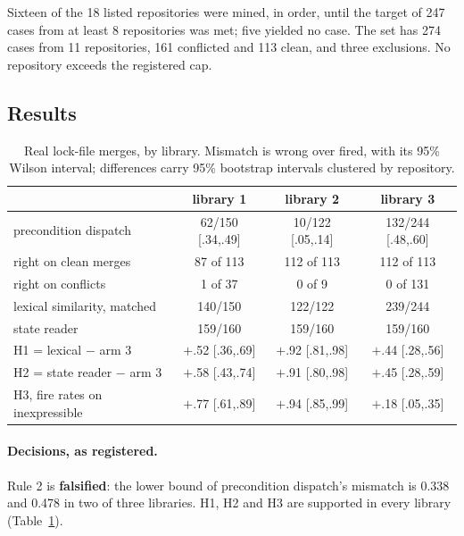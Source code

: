 \documentclass[11pt]{article}
\begin{document}
Sixteen of the 18 listed repositories were mined, in order, until the target of 247 cases from at
least 8 repositories was met; five yielded no case. The set has 274 cases from 11 repositories,
161 conflicted and 113 clean, and three exclusions. No repository exceeds the registered cap.

\subsection{Results}

\begin{table}[t]
\centering
\caption{Real lock-file merges, by library. Mismatch is wrong over fired, with its 95\% Wilson
interval; differences carry 95\% bootstrap intervals clustered by repository.}
\label{tab:real}
\small
\begin{tabularx}{\linewidth}{Xccc}
\toprule
& library 1 & library 2 & library 3 \\
\midrule
precondition dispatch & 62/150 [.34,.49] & 10/122 [.05,.14] & 132/244 [.48,.60] \\
\quad right on clean merges & 87 of 113 & 112 of 113 & 112 of 113 \\
\quad right on conflicts & 1 of 37 & 0 of 9 & 0 of 131 \\
lexical similarity, matched & 140/150 & 122/122 & 239/244 \\
state reader & 159/160 & 159/160 & 159/160 \\
\midrule
H1 = lexical $-$ arm 3 & $+$.52 [.36,.69] & $+$.92 [.81,.98] & $+$.44 [.28,.56] \\
H2 = state reader $-$ arm 3 & $+$.58 [.43,.74] & $+$.91 [.80,.98] & $+$.45 [.28,.59] \\
H3, fire rates on inexpressible & $+$.77 [.61,.89] & $+$.94 [.85,.99] & $+$.18 [.05,.35] \\
\bottomrule
\end{tabularx}
\end{table}

\paragraph{Decisions, as registered.}
Rule 2 is \textbf{falsified}: the lower bound of precondition dispatch's mismatch is 0.338 and
0.478 in two of three libraries. H1, H2 and H3 are supported in every library
(Table~\ref{tab:real}).
\end{document}
